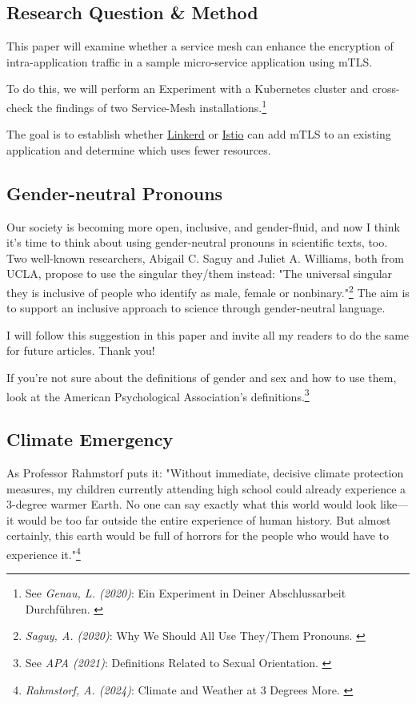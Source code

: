 \subsection{Research Question \& Method}

This paper will examine whether a service mesh can enhance the encryption of intra-application traffic in a sample micro-service application using mTLS.

To do this, we will perform an Experiment with a Kubernetes cluster and cross-check the findings of two Service-Mesh installations.\footnote{See \textit{Genau, L. (2020)}: Ein Experiment in Deiner Abschlussarbeit Durchführen. \cite{expScribbr}}

The goal is to establish whether \href{https://linkerd.io/}{Linkerd} or \href{https://istio.io/}{Istio} can add mTLS to an existing application and determine which uses fewer resources.

\subsection{Gender-neutral Pronouns}

Our society is becoming more open, inclusive, and gender-fluid, and now I think it's time to think about using gender-neutral pronouns in scientific texts, too. Two well-known researchers, Abigail C. Saguy and Juliet A. Williams, both from UCLA, propose to use the singular they/them instead: "The universal singular they is inclusive of people who identify as male, female or nonbinary."\footnote{\textit{Saguy, A. (2020)}: Why We Should All Use They/Them Pronouns. \cite{pronouns}} The aim is to support an inclusive approach to science through gender-neutral language. 

I will follow this suggestion in this paper and invite all my readers to do the same for future articles. Thank you!

If you're not sure about the definitions of gender and sex and how to use them, look at the American Psychological Association's definitions.\footnote{See \textit{APA (2021)}: Definitions Related to Sexual Orientation. \cite{apaDefinitions}}

\subsection{Climate Emergency}

As Professor Rahmstorf puts it: "Without immediate, decisive climate protection measures, my children currently attending high school could already experience a 3-degree warmer Earth. No one can say exactly what this world would look like—it would be too far outside the entire experience of human history. But almost certainly, this earth would be full of horrors for the people who would have to experience it."\footnote{\textit{Rahmstorf, A. (2024)}: Climate and Weather at 3 Degrees More. \cite{3dgreesMore}}
